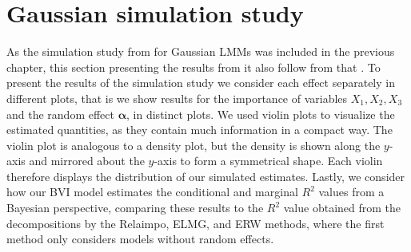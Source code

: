 \section{Gaussian simulation study}
\label{sec:simulation_study_gauss}
As the simulation study from \citet{Arnstad:Relative_variable_importance_in_Bayesian_linear_mixed_models:2024} for Gaussian LMMs was included in the previous chapter, this section presenting the results from it also follow from that \citet{Arnstad:Relative_variable_importance_in_Bayesian_linear_mixed_models:2024}.
To present the results of the simulation study we consider each effect separately in different plots, that is we show results for the importance of variables $X_1, X_2, X_3$ and the random effect $\boldsymbol{\alpha}$, in distinct plots. 
We used violin plots to visualize the estimated quantities, as they contain much information in a compact way. The violin plot is analogous to a density plot, but the density is shown along the $y$-axis and mirrored about the $y$-axis to form a symmetrical shape. Each violin therefore displays the distribution of our simulated estimates.
Lastly, we consider how our BVI model estimates the conditional and marginal $R^2$ values from a Bayesian perspective, comparing these results to the $R^2$ value obtained from the decompositions by the Relaimpo, ELMG, and ERW methods, where the first method only considers models without random effects. 
